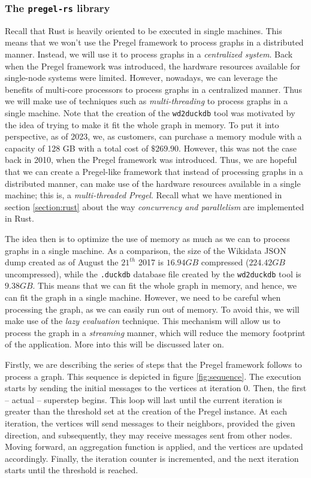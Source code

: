 \label{section:pregel-rs}
\subsubsection{The \texttt{pregel-rs} library}

Recall that Rust is heavily oriented to be executed in single machines. This means that we won't use the Pregel framework to process graphs in a distributed manner. Instead, we will use it to process graphs in a \textit{centralized system}. Back when the Pregel framework was introduced, the hardware resources available for single-node systems were limited. However, nowadays, we can leverage the benefits of multi-core processors to process graphs in a centralized manner. Thus we will make use of techniques such as \textit{multi-threading} to process graphs in a single machine. Note that the creation of the \texttt{wd2duckdb} tool was motivated by the idea of trying to make it fit the whole graph in memory. To put it into perspective, as of 2023, we, as customers, can purchase a memory module with a capacity of 128 GB with a total cost of $\$269.90$. However, this was not the case back in 2010, when the Pregel framework was introduced. Thus, we are hopeful that we can create a Pregel-like framework that instead of processing graphs in a distributed manner, can make use of the hardware resources available in a single machine; this is, a \textit{multi-threaded Pregel}. Recall what we have mentioned in section \ref{section:rust} about the way \textit{concurrency and parallelism} are implemented in Rust.

The idea then is to optimize the use of memory as much as we can to process graphs in a single machine. As a comparison, the size of the Wikidata JSON dump created as of August the $21^{th}$ 2017 is $16.94 GB$ compressed ($224.42 GB$ uncompressed), while the \texttt{.duckdb} database file created by the \texttt{wd2duckdb} tool is $9.38 GB$. This means that we can fit the whole graph in memory, and hence, we can fit the graph in a single machine. However, we need to be careful when processing the graph, as we can easily run out of memory. To avoid this, we will make use of the \textit{lazy evaluation} technique. This mechanism will allow us to process the graph in a \textit{streaming} manner, which will reduce the memory footprint of the application. More into this will be discussed later on.

Firstly, we are describing the series of steps that the Pregel framework follows to process a graph. This sequence is depicted in figure \ref{fig:sequence}. The execution starts by sending the initial messages to the vertices at iteration 0. Then, the first -- actual -- superstep begins. This loop will last until the current iteration is greater than the threshold set at the creation of the Pregel instance. At each iteration, the vertices will send messages to their neighbors, provided the given direction, and subsequently, they may receive messages sent from other nodes. Moving forward, an aggregation function is applied, and the vertices are updated accordingly. Finally, the iteration counter is incremented, and the next iteration starts until the threshold is reached.

